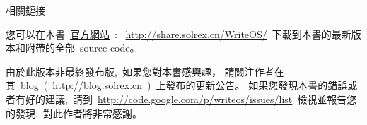 \vspace{5ex}

\begin{lined}{\textwidth}\vspace{2ex}
\begin{center}
相關鏈接
\end{center}
\vspace{2ex}
\end{lined}

您可以在本書~\href{http://share.solrex.cn/WriteOS/}{官方網站}~: ~\url{http://share.solrex.cn/WriteOS/}~下載到本書的最新版本和附帶的全部~source code。

由於此版本非最終發布版,~如果您對本書感興趣，
請關注作者在其~\href{http://blog.solrex.cn/articles/category/cs/opensource/writeos}{blog}~(~\url{http://blog.solrex.cn}~)~上發布的更新公告。
如果您發現本書的錯誤或者有好的建議,~請到~\url{http://code.google.com/p/writeos/issues/list}~檢視並報告您的發現,~對此作者將非常感謝。
